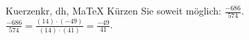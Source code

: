 \begin{MAufgabe}{Kuerzen}{kr, dh, MaTeX}
K\"urzen Sie soweit m\"oglich: $\frac{-686}{574}$.\\ 
\ifLsg\MLoesung
\quad $\frac{-686}{574}=\frac{(14)\cdot(-49)}{(14)\cdot(41)}=\frac{-49}{41}$.\else\relax\fi
 \end{MAufgabe}